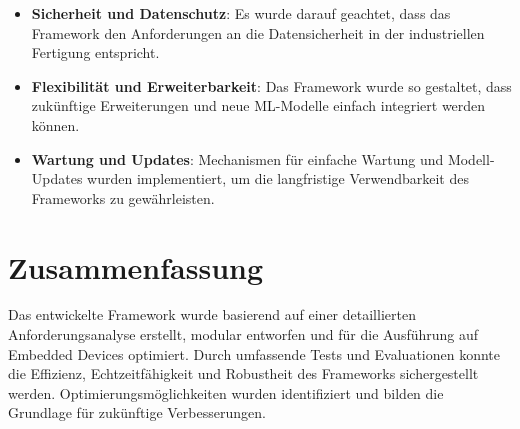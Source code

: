 \begin{itemize}
    \item \textbf{Sicherheit und Datenschutz}: Es wurde darauf geachtet, dass das Framework den Anforderungen an die Datensicherheit in der industriellen 
    Fertigung entspricht.
    \item \textbf{Flexibilität und Erweiterbarkeit}: Das Framework wurde so gestaltet, dass zukünftige Erweiterungen und neue ML-Modelle einfach integriert werden können.
    \item \textbf{Wartung und Updates}: Mechanismen für einfache Wartung und Modell-Updates wurden implementiert, um die langfristige Verwendbarkeit 
    des Frameworks zu gewährleisten.
\end{itemize}

\section{Zusammenfassung}
Das entwickelte Framework wurde basierend auf einer detaillierten Anforderungsanalyse erstellt, modular entworfen und für die Ausführung auf 
Embedded Devices optimiert. Durch umfassende Tests und Evaluationen konnte die Effizienz, Echtzeitfähigkeit und Robustheit des Frameworks sichergestellt werden. 
Optimierungsmöglichkeiten wurden identifiziert und bilden die Grundlage für zukünftige Verbesserungen.